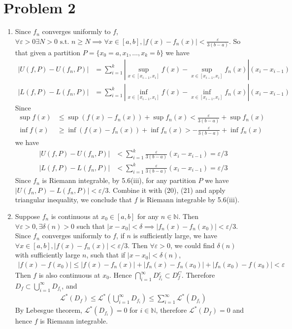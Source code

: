 \documentclass[a4paper]{report}
\def\ve{\varepsilon}
\newcommand{\mcal}[1]{\mathcal{#1}}
\begin{document}
\section*{Problem 2}

\begin{enumerate}[label=(\alph*)]

\item 
Since $f_n$ converges uniformly to $f$, $\forall \ve > 0 \exists N > 0 \text{ s.t. } n \ge
N \implies \forall x \in [a,b], |f(x) - f_n(x)| < \frac{\ve}{3(b-a)}$. So that given a 
partition $P = \{x_0=a, x_1, \ldots, x_k = b\}$ we have 
\begin{align}
    |U(f, P) - U(f_n, P)| &= \sum_{i=1}^k \left|\sup_{x\in [x_{i-1}, x_i]} f(x)-\sup_{x\in 
        [x_{i-1}, x_i]} f_n(x) \right| (x_i - x_{i-1}) \\
    |L(f, P) - L(f_n, P)| &= \sum_{i=1}^k \left|\inf_{x\in [x_{i-1}, x_i]} f(x)-\inf_{x\in 
        [x_{i-1}, x_i]} f_n(x) \right| (x_i - x_{i-1})
\end{align}
Since 
\begin{align}
    \sup f(x) &\le \sup (f(x) - f_n(x)) + \sup f_n(x) < \frac{\ve}{3(b-a)}+\sup f_n(x) \\
    \inf f(x) &\ge \inf (f(x) - f_n(x)) + \inf f_n(x) > -\frac{\ve}{3(b-a)}+\inf f_n(x)
\end{align}
we have 
\begin{align}
    |U(f, P) - U(f_n, P)| &< \sum_{i=1}^k \frac{\ve}{3(b-a)} (x_i - x_{i-1}) = \ve / 3 \\
    |L(f, P) - L(f_n, P)| &< \sum_{i=1}^k \frac{\ve}{3(b-a)} (x_i - x_{i-1}) = \ve / 3
\end{align}
Since $f_n$ is Riemann integrable, by 5.6(iii), for any partition $P$ we have 
$|U(f_n, P) - L(f_n, P)| < \ve / 3$. Combine it with (20), (21) and apply triangular 
inequality, we conclude that $f$ is Riemann integrable by 5.6(iii).

\item

Suppose $f_n$ is continuous at $x_0 \in [a, b]$ for any $n \in \mathbb{N}$. Then $\forall 
\ve > 0, \exists \delta(n) > 0$ such that $|x - x_0| < \delta \implies |f_n(x) - f_n(x_0)|
< \ve / 3$. Since $f_n$ converges uniformly to $f$, if $n$ is sufficiently large,
we have $\forall x \in [a,b], |f(x) - f_n(x)| < \ve / 3$. Then $\forall \ve > 0$, we could 
find $\delta(n)$ with sufficiently large $n$, such that if $|x - x_0| < \delta(n)$, 
\begin{align}
    |f(x)-f(x_0)| \le |f(x) - f_n(x)| + |f_n(x) - f_n(x_0)| + |f_n(x_0) - f(x_0)| < \ve
\end{align}
Then $f$ is also continuous at $x_0$. Hence $\bigcap_{i=1}^\infty D_{f_i}^c \subset D_f^C$.
Therefore $D_f \subset \bigcup_{i=1}^\infty D_{f_i}$, and 
\begin{align}
    \mcal{L}^*(D_f) \le \mcal{L}^*\left(\bigcup_{i=1}^\infty D_{f_i}\right) \le 
    \sum_{i=1}^\infty \mcal{L}^* ({D_{f_i}})
\end{align}
By Lebesgue theorem, $\mcal{L}^* ({D_{f_i}}) = 0$ for $i \in \mathbb{N}$, therefore 
$\mcal{L}^* (D_f) = 0$ and hence $f$ is Riemann integrable.

\end{enumerate}
\end{document}
